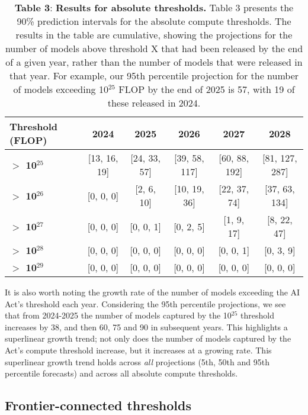 \documentclass[11pt]{article}
\begin{document}
\begin{table}[h]
\centering
\caption*{\textbf{Table 3}: \textbf{Results for absolute thresholds.} Table 3 presents the 90\% prediction intervals for the absolute compute thresholds. The results in the table are cumulative, showing the projections for the number of models above threshold X that had been released by the end of a given year, rather than the number of models that were released in that year. For example, our 95th percentile projection for the number of models exceeding 10$^{25}$ FLOP by the end of 2025 is 57, with 19 of these released in 2024.}
\label{tab:absolute-thresholds}
\begin{tabular}{|l|c|c|c|c|c|}
\hline
\textbf{Threshold (FLOP)} & \textbf{2024} & \textbf{2025} & \textbf{2026} & \textbf{2027} & \textbf{2028} \\
\hline
\textbf{$>$ 10$^{25}$} & [13, 16, 19] & [24, 33, 57] & [39, 58, 117] & [60, 88, 192] & [81, 127, 287] \\
\hline
\textbf{$>$ 10$^{26}$} & [0, 0, 0] & [2, 6, 10] & [10, 19, 36] & [22, 37, 74] & [37, 63, 134] \\
\hline
\textbf{$>$ 10$^{27}$} & [0, 0, 0] & [0, 0, 1] & [0, 2, 5] & [1, 9, 17] & [8, 22, 47] \\
\hline
\textbf{$>$ 10$^{28}$} & [0, 0, 0] & [0, 0, 0] & [0, 0, 0] & [0, 0, 1] & [0, 3, 9] \\
\hline
\textbf{$>$ 10$^{29}$} & [0, 0, 0] & [0, 0, 0] & [0, 0, 0] & [0, 0, 0] & [0, 0, 0] \\
\hline
\end{tabular}
\end{table}

It is also worth noting the growth rate of the number of models exceeding the AI Act's threshold each year. Considering the 95th percentile projections, we see that from 2024-2025 the number of models captured by the 10$^{25}$ threshold increases by 38, and then 60, 75 and 90 in subsequent years. This highlights a superlinear growth trend; not only does the number of models captured by the Act's compute threshold increase, but it increases at a growing rate. This superlinear growth trend holds across \textit{all} projections (5th, 50th and 95th percentile forecasts) and across all absolute compute thresholds.

\subsection{Frontier-connected thresholds}
\end{document}
